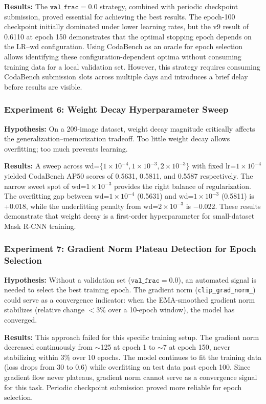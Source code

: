 \documentclass[12pt, a4paper]{article}
\begin{document}
\textbf{Results:} The $\texttt{val\_frac}=0.0$ strategy, combined with periodic checkpoint submission, proved essential for achieving the best results. The epoch-100 checkpoint initially dominated under lower learning rates, but the v9 result of 0.6110 at epoch 150 demonstrates that the optimal stopping epoch depends on the LR–wd configuration. Using CodaBench as an oracle for epoch selection allows identifying these configuration-dependent optima without consuming training data for a local validation set. However, this strategy requires consuming CodaBench submission slots across multiple days and introduces a brief delay before results are visible.

\subsubsection{Experiment 6: Weight Decay Hyperparameter Sweep}
\textbf{Hypothesis:} On a 209-image dataset, weight decay magnitude critically affects the generalization–memorization tradeoff. Too little weight decay allows overfitting; too much prevents learning.

\textbf{Results:} A sweep across wd=$\{1 \times 10^{-4}, 1 \times 10^{-3}, 2 \times 10^{-3}\}$ with fixed lr=$1 \times 10^{-4}$ yielded CodaBench AP50 scores of 0.5631, 0.5811, and 0.5587 respectively. The narrow sweet spot of wd=$1 \times 10^{-3}$ provides the right balance of regularization. The overfitting gap between wd=$1 \times 10^{-4}$ (0.5631) and wd=$1 \times 10^{-3}$ (0.5811) is +0.018, while the underfitting penalty from wd=$2 \times 10^{-3}$ is $-$0.022. These results demonstrate that weight decay is a first-order hyperparameter for small-dataset Mask R-CNN training.

\subsubsection{Experiment 7: Gradient Norm Plateau Detection for Epoch Selection}
\textbf{Hypothesis:} Without a validation set ($\texttt{val\_frac}=0.0$), an automated signal is needed to select the best training epoch.
The gradient norm (\texttt{clip\_grad\_norm\_}) could serve as a convergence indicator:
when the EMA-smoothed gradient norm stabilizes (relative change $<3\%$ over a 10-epoch window),
the model has converged.

\textbf{Results:} This approach failed for this specific training setup. The gradient norm decreased continuously from $\sim$125 at epoch 1 to $\sim$7 at epoch 150, never stabilizing within 3\% over 10 epochs. The model continues to fit the training data (loss drops from 30 to 0.6) while overfitting on test data past epoch 100. Since gradient flow never plateaus, gradient norm cannot serve as a convergence signal for this task. Periodic checkpoint submission proved more reliable for epoch selection.
\end{document}
